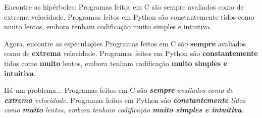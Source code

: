 \documentclass{beamer}
\begin{document}
\begin{frame}[fragile]{Encontre as hipérboles:}
  \centering
  \large
  Programas feitos em C são sempre avaliados como de extrema velocidade.
  Programas feitos em Python são constantemente tidos como muito lentos, embora
  tenham codificação muito simples e intuitiva.
\end{frame}

\begin{frame}[fragile]{Agora, encontre as especulações}
  \centering
  \large
  Programas feitos em C são \textbf{sempre} avaliados como de \textbf{extrema} velocidade.
  Programas feitos em Python são \textbf{constantemente} tidos como
  \textbf{muito} lentos, embora
  tenham codificação \textbf{muito simples e intuitiva}.
\end{frame}

\begin{frame}[fragile]{Há um problema...}
  \centering
  \large
  Programas feitos em C são \textit{ \textbf{sempre} avaliados como de
  \textbf{extrema} velocidade.}
  Programas feitos em Python são \textit{ \textbf{constantemente} tidos como
  \textbf{muito} lentos, embora
  tenham codificação \textbf{muito simples e intuitiva}.}
\end{frame}
\end{document}

